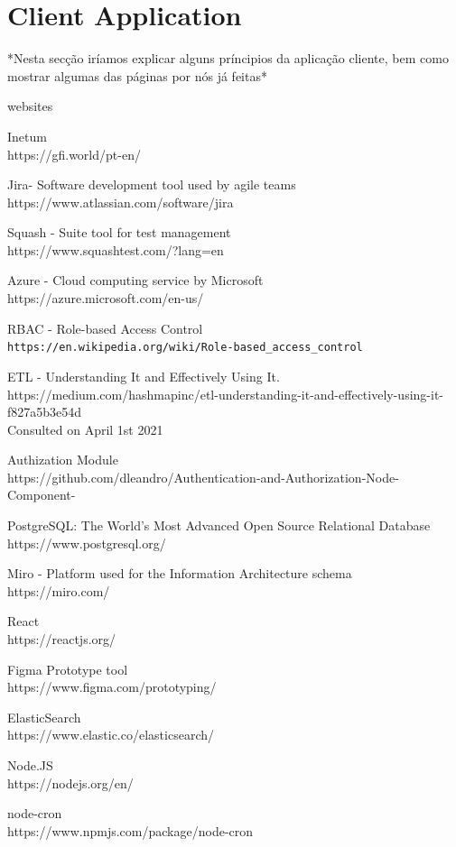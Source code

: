 \documentclass[a4paper,twoside,10pt]{report}
\begin{document}
\chapter{Client Application}
*Nesta secção iríamos explicar alguns príncipios da aplicação cliente, bem como mostrar algumas das páginas por nós já feitas*

\begin{thebibliography} {websites}

 Inetum\\ https://gfi.world/pt-en/

 Jira- Software development tool used by agile teams\\
https://www.atlassian.com/software/jira

 Squash - Suite tool for test management\\
https://www.squashtest.com/?lang=en

 Azure - Cloud computing service by Microsoft\\
https://azure.microsoft.com/en-us/

 RBAC - Role-based Access Control\\
\texttt{https://en.wikipedia.org/wiki/Role-based\_access\_control}

 ETL - Understanding It and Effectively Using It.\\
https://medium.com/hashmapinc/etl-understanding-it-and-effectively-using-it-f827a5b3e54d\\
Consulted on April 1st 2021

 Authization Module\\
https://github.com/dleandro/Authentication-and-Authorization-Node-Component-

 PostgreSQL: The World's Most Advanced Open Source Relational Database\\
https://www.postgresql.org/

 Miro - Platform used for the Information Architecture schema\\
https://miro.com/

 React\\ https://reactjs.org/

 Figma Prototype tool\\https://www.figma.com/prototyping/

 ElasticSearch \\ https://www.elastic.co/elasticsearch/

 Node.JS \\ https://nodejs.org/en/

 node-cron \\ https://www.npmjs.com/package/node-cron
\end{thebibliography}
\end{document}
